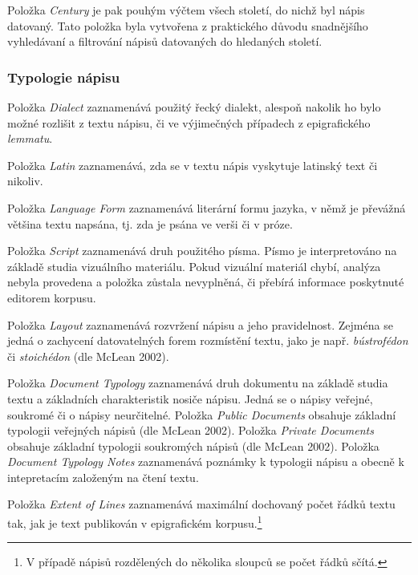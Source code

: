 Položka {\em Century} je pak pouhým výčtem všech století, do nichž byl nápis datovaný. Tato položka byla vytvořena z praktického důvodu snadnějšího vyhledávaní a filtrování nápisů datovaných do hledaných století.

\subsubsection[typologie-nápisu]{Typologie nápisu}

\startitemize
\item
  \startblockquote
  Položka {\em Dialect} zaznamenává použitý řecký dialekt, alespoň nakolik ho bylo možné rozlišit z textu nápisu, či ve výjimečných případech z epigrafického {\em lemmatu}.
  \stopblockquote
\item
  \startblockquote
  Položka {\em Latin} zaznamenává, zda se v textu nápis vyskytuje latinský text či nikoliv.
  \stopblockquote
\item
  \startblockquote
  Položka {\em Language Form} zaznamenává literární formu jazyka, v němž je převážná většina textu napsána, tj. zda je psána ve verši či v próze.
  \stopblockquote
\item
  \startblockquote
  Položka {\em Script} zaznamenává druh použitého písma. Písmo je interpretováno na základě studia vizuálního materiálu. Pokud vizuální materiál chybí, analýza nebyla provedena a položka zůstala nevyplněná, či přebírá informace poskytnuté editorem korpusu.
  \stopblockquote
\item
  \startblockquote
  Položka {\em Layout} zaznamenává rozvržení nápisu a jeho pravidelnost. Zejména se jedná o zachycení datovatelných forem rozmístění textu, jako je např. {\em bústrofédon} či {\em stoichédon} (dle McLean 2002).
  \stopblockquote
\item
  \startblockquote
  Položka {\em Document Typology} zaznamenává druh dokumentu na základě studia textu a základních charakteristik nosiče nápisu. Jedná se o nápisy veřejné, soukromé či o nápisy neurčitelné. Položka {\em Public Documents} obsahuje základní typologii veřejných nápisů (dle McLean 2002). Položka {\em Private Documents} obsahuje základní typologii soukromých nápisů (dle McLean 2002). Položka {\em Document Typology Notes} zaznamenává poznámky k typologii nápisu a obecně k intepretacím založeným na čtení textu.
  \stopblockquote
\item
  \startblockquote
  Položka {\em Extent of Lines} zaznamenává maximální dochovaný počet řádků textu tak, jak je text publikován v epigrafickém korpusu.\footnote{V případě nápisů rozdělených do několika sloupců se počet řádků sčítá.}
  \stopblockquote
\stopitemize

